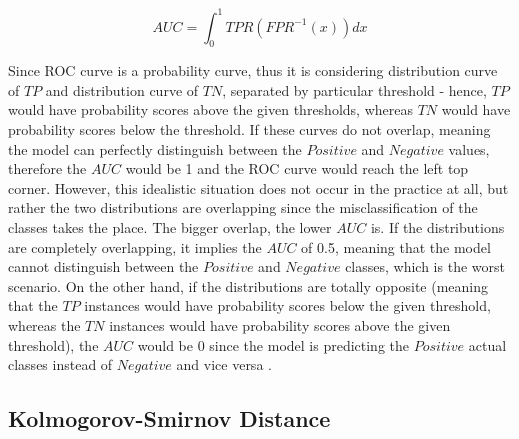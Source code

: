 \begin{equation}\label{eq}
    AUC = \int_{0}^{1} TPR \left(FPR^{-1}\left(x \right)\right) dx
\end{equation}


Since ROC curve is a probability curve, thus it is considering distribution curve of $TP$ and distribution curve of $TN$, separated by particular threshold - hence, $TP$ would have probability scores above the given thresholds, whereas $TN$ would have probability scores below the threshold.
If these curves do not overlap, meaning the model can perfectly distinguish between the $Positive$ and $Negative$ values, therefore the $AUC$ would be 1 and the ROC curve would reach the left top corner.
However, this idealistic situation does not occur in the practice at all, but rather the two distributions are overlapping since the misclassification of the classes takes the place.
The bigger overlap, the lower $AUC$ is.
If the distributions are completely overlapping, it implies the $AUC$ of 0.5, meaning that the model cannot distinguish between the $Positive$ and $Negative$ classes, which is the worst scenario.
On the other hand, if the distributions are totally opposite (meaning that the $TP$ instances would have probability scores below the given threshold, whereas the $TN$ instances would have probability scores above the given threshold), the $AUC$ would be 0 since the model is predicting the $Positive$ actual classes instead of $Negative$ and vice versa \citep{narkhede2018understanding}.



\subsection{Kolmogorov-Smirnov Distance}

